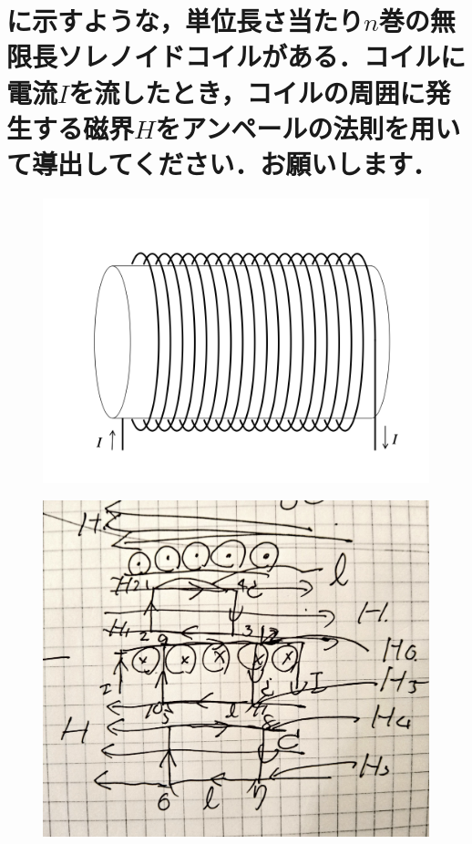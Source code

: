 \documentclass[dvipdfmx]{ujarticle}
\begin{document}
\section{に示すような，単位長さ当たり$n$巻の無限長ソレノイドコイルがある．コイルに電流$I$を流したとき，コイルの周囲に発生する磁界$H$をアンペールの法則を用いて導出してください．お願いします．}

\begin{figure}[h]
	\centering
	\includegraphics[scale=0.35]{./fig/R03_fig2.png}
	\caption{}
	\label{fig:2}
\end{figure}

\begin{figure}[h]
	\centering
	\includegraphics[scale=0.35]{./fig/fig.pdf}
	\caption{}
	\label{fig:a}
\end{figure}
\end{document}
